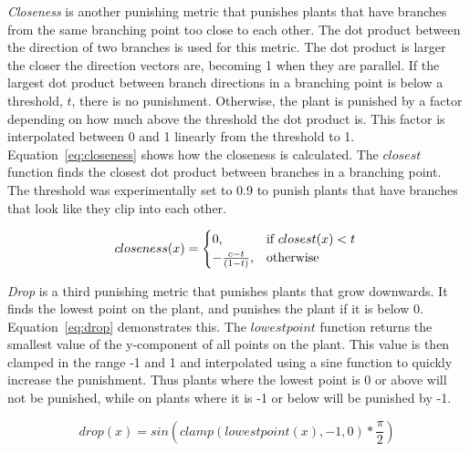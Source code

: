 \textit{Closeness} is another punishing metric that punishes plants that have branches from the same branching point too close to each other.
The dot product between the direction of two branches is used for this metric.
The dot product is larger the closer the direction vectors are, becoming 1 when they are parallel.
If the largest dot product between branch directions in a branching point is below a threshold, $t$, there is no punishment.
Otherwise, the plant is punished by a factor depending on how much above the threshold the dot product is.
This factor is interpolated between 0 and 1 linearly from the threshold to 1.
Equation~\ref{eq:closeness} shows how the closeness is calculated.
The $closest$ function finds the closest dot product between branches in a branching point.
The threshold was experimentally set to 0.9 to punish plants that have branches that look like they clip into each other.

\begin{equation}
\label{eq:closeness}
    closeness(x) =
    \begin{cases}
        0,& \text{if } closest(x) < t \\
        -\frac{c - t}{(1 - t)},& \text{otherwise}
    \end{cases} \\
\end{equation}

\textit{Drop} is a third punishing metric that punishes plants that grow downwards.
It finds the lowest point on the plant, and punishes the plant if it is below 0.
Equation~\ref{eq:drop} demonstrates this.
The $lowestpoint$ function returns the smallest value of the y-component of all points on the plant.
This value is then clamped in the range -1 and 1 and interpolated using a sine function to quickly increase the punishment.
Thus plants where the lowest point is 0 or above will not be punished, while on plants where it is -1 or below will be punished by -1.

\begin{equation}
\label{eq:drop}
drop(x) = sin(clamp(lowestpoint(x), -1, 0) * \frac{\pi}{2})
\end{equation}

